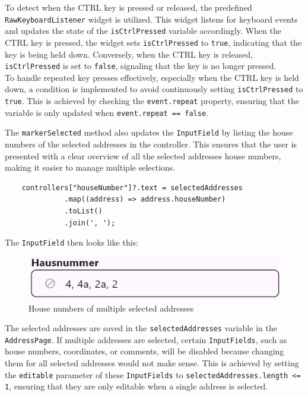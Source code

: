 To detect when the CTRL key is pressed or released, the predefined \texttt{RawKeyboardListener} widget is utilized. This widget listens for keyboard events and updates the state of the \texttt{isCtrlPressed} variable accordingly. When the CTRL key is pressed, the widget sets \texttt{isCtrlPressed} to \texttt{true}, indicating that the key is being held down. Conversely, when the CTRL key is released, \texttt{isCtrlPressed} is set to \texttt{false}, signaling that the key is no longer pressed.\\

To handle repeated key presses effectively, especially when the CTRL key is held down, a condition is implemented to avoid continuously setting \texttt{isCtrlPressed} to \texttt{true}. This is achieved by checking the \texttt{event.repeat} property, ensuring that the variable is only updated when \texttt{event.repeat == false}.
\newpage



The \texttt{markerSelected} method also updates the \texttt{InputField} by listing the house numbers of the selected addresses in the controller. This ensures that the user is presented with a clear overview of all the selected addresses house numbers, making it easier to manage multiple selections.


\lstset{style=mycsharp, caption=Listed house numbers for multiple selected addresses}
\begin{lstlisting}
    controllers["houseNumber"]?.text = selectedAddresses
              .map((address) => address.houseNumber)
              .toList()
              .join(', ');
\end{lstlisting}

The \texttt{InputField} then looks like this:
\begin{figure}[H]
    \centering
    \includegraphics[width=0.6\linewidth]{images/AdminPanel/listedHouseNumbersInputField.png}
    \caption{House numbers of multiple selected addresses}
\end{figure}

The selected addresses are saved in the \texttt{selectedAddresses} variable in the \texttt{AddressPage}. If multiple addresses are selected, certain \texttt{InputFields}, such as house numbers, coordinates, or comments, will be disabled because changing them for all selected addresses would not make sense. This is achieved by setting the \texttt{editable} parameter of these \texttt{InputFields} to \texttt{selectedAddresses.length <= 1}, ensuring that they are only editable when a single address is selected.


